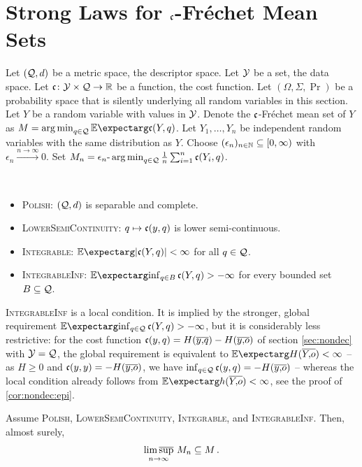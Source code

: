 %
\section{Strong Laws for $\mathfrak{c}$-Fréchet Mean Sets}\label{sec:gen}
%
Let $(\mathcal{Q}, d)$ be a metric space, the descriptor space. Let $\mathcal{Y}$ be a set, the data space. Let $\mathfrak{c}\colon \mathcal{Y} \times\mathcal{Q} \to \mathbb{R}$ be a function, the cost function. Let $(\Omega, \Sigma, \Pr)$ be a probability space that is silently underlying all random variables in this section. Let $Y$ be a random variable with values in $\mathcal{Y}$. Denote the $\mathfrak{c}$-Fréchet mean set of $Y$ as $M = \argmin_{q\in\mc Q} \Ex{\mf c(Y, q)}$.
Let $Y_1, \dots, Y_n$ be independent random variables with the same distribution as $Y$.
Choose $(\epsilon_n)_{n\in\mathbb{N}}\subseteq [0,\infty)$ with $\epsilon_n \xrightarrow{n\to\infty}0$. Set $M_n = \epsilon_n\text{-}\operatorname*{arg\,min}_{q\in\mathcal{Q}} \frac1n \sum_{i=1}^n \mathfrak{c}(Y_i, q)$.
%
\begin{assumptions}\mbox{ }
\begin{itemize}
\item 
	\textsc{Polish}: 
	$(\mathcal{Q}, d)$ is separable and complete.
\item 
	\textsc{LowerSemiContinuity}: 
	$q \mapsto \mathfrak{c}(y, q)$ is lower semi-continuous.
\item 
	\textsc{Integrable}: 
	$\Ex{\abs{\mf c(Y, q)}} < \infty$ for all $q\in\mathcal{Q}$.
\item
	\textsc{IntegrableInf}:
	$\Ex{\inf_{q \in B}\mf c(Y, q)} > - \infty$ for every bounded set $B \subseteq \mathcal{Q}$.
\end{itemize}
\end{assumptions}
%
\begin{remark}\label{rem:integrableinf}
	\textsc{IntegrableInf} is a local condition. It is implied by the stronger, global requirement $\Ex{\inf_{q \in \mc Q}\mf c(Y, q)} > - \infty$, but it is considerably less restrictive: for the cost function $\mathfrak{c}(y,q) = H(\overline{y,\!q}) - H(\overline{y,\!o})$ of section \ref{sec:nondec} with $\mathcal{Y} = \mathcal{Q}$, the global requirement is equivalent to $\Ex{H(\ol Yo)} < \infty$ -- as $H\geq0$ and $\mathfrak{c}(y,y) = -H(\overline{y,\!o})$, we have $\inf_{q\in\mathcal{Q}}\mathfrak{c}(y, q) = -H(\overline{y,\!o})$ -- whereas the local condition already follows from $\Ex{h(\ol Yo)} < \infty$, see the proof of \autoref{cor:nondec:epi}.
\end{remark}
%
\begin{theorem}\label{thm:epi}
	Assume \textsc{Polish}, \textsc{LowerSemiContinuity}, \textsc{Integrable}, and \textsc{IntegrableInf}.
	Then, almost surely,
	\begin{equation*}
		\operatorname*{lim\, \overline{sup}}_{n\to\infty}\, M_n \subseteq M
		\, .
	\end{equation*}
\end{theorem}
